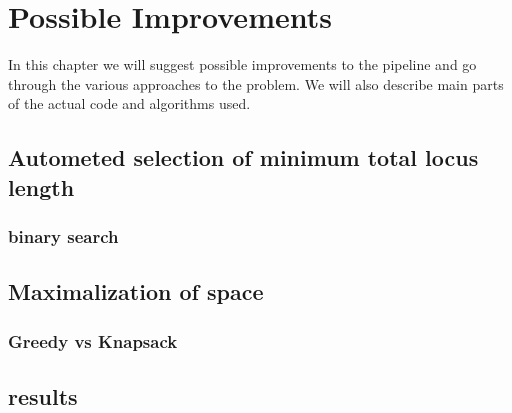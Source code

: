 \chapter[Possible Improvements]{Possible Improvements}
\label{kap:improvements}

In this chapter we will suggest possible improvements to the pipeline and go through the various approaches to the problem. 
We will also describe main parts of the actual code and algorithms used. 

\section{Autometed selection of minimum total locus length}

\subsection{binary search}

\section{Maximalization of space}

\subsection{Greedy vs Knapsack}

\section{results}


